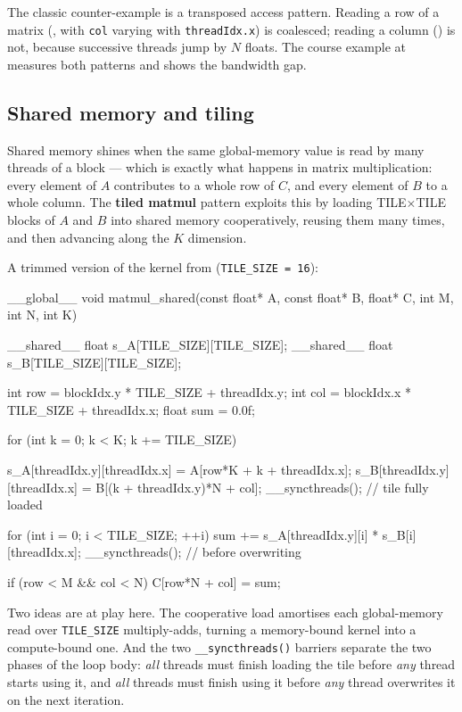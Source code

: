 The classic counter-example is a transposed access pattern. Reading a row of a matrix (, with \texttt{col} varying with \texttt{threadIdx.x}) is coalesced; reading a column () is not, because successive threads jump by $N$ floats. The course example at  measures both patterns and shows the bandwidth gap.

\subsection{Shared memory and tiling}
\label{subsec:shared-tiling}

Shared memory shines when the same global-memory value is read by many threads of a block --- which is exactly what happens in matrix multiplication: every element of $A$ contributes to a whole row of $C$, and every element of $B$ to a whole column. The \textbf{tiled matmul} pattern exploits this by loading TILE$\times$TILE blocks of $A$ and $B$ into shared memory cooperatively, reusing them many times, and then advancing along the $K$ dimension.

A trimmed version of the kernel from  (\texttt{TILE\_SIZE = 16}):

\begin{codeblock}[language=C]
__global__ void matmul_shared(const float* A, const float* B,
                              float* C, int M, int N, int K) {
    __shared__ float s_A[TILE_SIZE][TILE_SIZE];
    __shared__ float s_B[TILE_SIZE][TILE_SIZE];

    int row = blockIdx.y * TILE_SIZE + threadIdx.y;
    int col = blockIdx.x * TILE_SIZE + threadIdx.x;
    float sum = 0.0f;

    for (int k = 0; k < K; k += TILE_SIZE) {
        s_A[threadIdx.y][threadIdx.x] = A[row*K + k + threadIdx.x];
        s_B[threadIdx.y][threadIdx.x] = B[(k + threadIdx.y)*N + col];
        __syncthreads();                      // tile fully loaded

        for (int i = 0; i < TILE_SIZE; ++i)
            sum += s_A[threadIdx.y][i] * s_B[i][threadIdx.x];
        __syncthreads();                      // before overwriting
    }
    if (row < M && col < N) C[row*N + col] = sum;
}
\end{codeblock}

Two ideas are at play here. The cooperative load amortises each global-memory read over \texttt{TILE\_SIZE} multiply-adds, turning a memory-bound kernel into a compute-bound one. And the two \texttt{\_\_syncthreads()} barriers separate the two phases of the loop body: \emph{all} threads must finish loading the tile before \emph{any} thread starts using it, and \emph{all} threads must finish using it before \emph{any} thread overwrites it on the next iteration.

